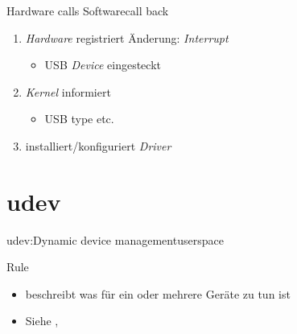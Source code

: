 \documentclass{beamer}
\begin{document}
\begin{frame}{Hardware calls Software}{call back}
 \begin{enumerate}
  \item {\em Hardware} registriert Änderung: {\em Interrupt}
  \begin{itemize}
   \item USB {\em Device} eingesteckt
  \end{itemize}
  \item {\em Kernel} informiert \unix
  \begin{itemize}
   \item USB type etc.
  \end{itemize}
  \item \unix installiert/konfiguriert {\em Driver}  
 \end{enumerate}
\end{frame}

\section{udev}

\begin{frame}{udev:Dynamic device management}{userspace}
 \begin{block}{Rule}
  \begin{itemize}
   \item beschreibt was für ein oder mehrere Geräte zu tun ist
   \item Siehe , 
  \end{itemize}
 \end{block}
\end{frame}
\end{document}
